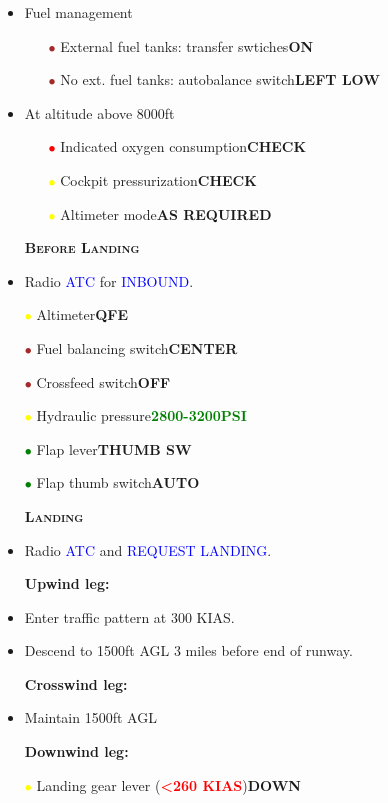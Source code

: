 \documentclass[a4paper,12pt,dvipsnames]{letter}
\newcommand{\radio}[1]{\textcolor{blue}{#1}}
\newcommand{\button}[1]{\textbf{#1}}
\newcommand{\ok}[1]{\textcolor{Green}{\textbf{#1}}}
\newcommand{\warn}[1]{\textcolor{Red}{\textbf{#1}}}
\newcommand{\myHead}[1]{{\LARGE\textsc{\textbf{#1}}}}
\newcommand{\ri}{\textcolor{Red}{$\bullet$\;}}
\newcommand{\gi}{\textcolor{Green}{$\bullet$\;}}
\newcommand{\yi}{\textcolor{Yellow}{$\bullet$\;}}
\renewcommand{\ni}{\textcolor{Brown}{$\bullet$\;}}
\newcommand{\tb}[1]{\textbf{#1}}
\begin{document}
{\begin{itemize}
 \item Fuel management
 \begin{itemize}
 \item[\ni] External fuel tanks: transfer swtiches\dotfill\button{ON}
 \item[\ni] No ext. fuel tanks: autobalance switch\dotfill\button{LEFT LOW}
 \end{itemize}
 \item At altitude above 8000\;ft
 \begin{itemize}
 \item[\ri] Indicated oxygen consumption\dotfill\button{CHECK}
 \item[\yi] Cockpit pressurization\dotfill\button{CHECK}
 \item[\yi] Altimeter mode\dotfill\button{AS REQUIRED}
 \end{itemize}
\end{itemize}
\newpage
\begin{itemize}
 \item[] \myHead{Before Landing}
 \item Radio \radio{ATC} for \radio{INBOUND}.
 \item[\yi] Altimeter\dotfill\button{QFE}
 \item[\ni] Fuel balancing switch\dotfill\button{CENTER}
 \item[\ni] Crossfeed switch\dotfill\button{OFF}
 \item[\yi] Hydraulic pressure\dotfill\ok{2800-3200\;PSI}
 \item[\gi] Flap lever\dotfill\button{THUMB SW}
 \item[\gi] Flap thumb switch\dotfill\button{AUTO}
\end{itemize}
\begin{itemize}
 \item[] \myHead{Landing}
 \item Radio \radio{ATC} and \radio{REQUEST LANDING}.
 \item[] \tb{Upwind leg:}
 \item Enter traffic pattern at 300 KIAS.
 \item Descend to 1500\;ft AGL 3 miles before end of runway.
 \item[] \tb{Crosswind leg:}
 \item Maintain 1500\;ft AGL
 \item[] \tb{Downwind leg:}
 \item[\yi] Landing gear lever (\warn{<260 KIAS})\dotfill\button{DOWN}

\end{itemize}}
\end{document}
